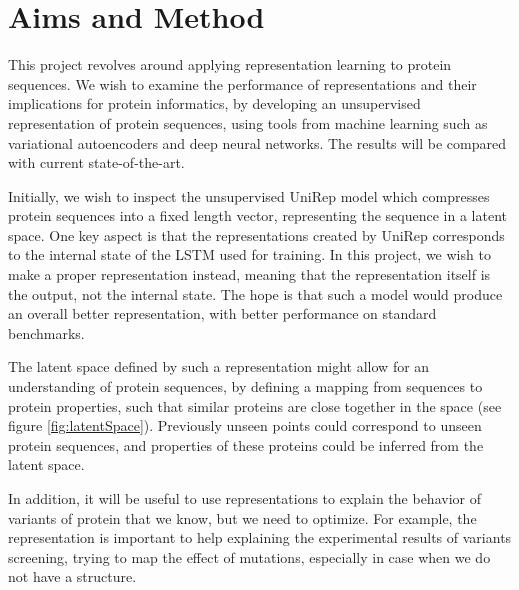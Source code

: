 \section*{Aims and Method}
This project revolves around applying representation learning to protein sequences. We wish to examine the performance of representations and their implications for protein informatics, by developing an unsupervised representation of protein sequences, using tools from machine learning such as variational autoencoders and deep neural networks. The results will be compared with current state-of-the-art.

Initially, we wish to inspect the unsupervised UniRep model \cite{alley2019unified} which compresses protein sequences into a fixed length vector, representing the sequence in a latent space. One key aspect is that the representations created by UniRep corresponds to the internal state of the LSTM used for training. In this project, we wish to make a proper representation instead, meaning that the representation itself is the output, not the internal state. The hope is that such a model would produce an overall better representation, with better performance on standard benchmarks.

The latent space defined by such a representation might allow for an understanding of protein sequences, by defining a mapping from sequences to protein properties, such that similar proteins are close together in the space (see figure \ref{fig:latentSpace}). Previously unseen points could correspond to unseen protein sequences, and properties of these proteins could be inferred from the latent space.

In addition, it will be useful to use representations to explain the behavior of variants of protein that we know, but we need to optimize. For example, the representation is important to help explaining the experimental results of variants screening, trying to map the effect of mutations, especially in case when we do not have a structure.

